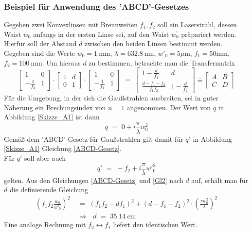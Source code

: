 \documentclass[11pt,a4paper,oneside]{scrartcl}
\begin{document}
\subsubsection{Beispiel für Anwendung des 'ABCD'-Gesetzes}
Gegeben zwei Konvexlinsen mit Brennweiten $f_1,f_2$ soll ein Laserstrahl, dessen Waist $w_0$ anfangs in der ersten Linse sei, auf den Waist $w_0^\prime$ präpariert werden. Hierfür soll der Abstand $d$ zwischen den beiden Linsen bestimmt werden.\\
Gegeben sind die Werte $w_0 = 1\ \mathrm{mm}$, $\lambda = 632.8\ \mathrm{nm}$, ${w'}_0 = 5 \mu \mathrm m$, $f_1 = 50\mathrm{mm}$, $f_2 = 100\ \mathrm{mm}$. Um hieraus $d$ zu bestimmen, betrachte man die Transfermatrix
\begin{equation}
\begin{bmatrix}
    1 & 0 \\
    -\frac{1}{f_2} & 1 
\end{bmatrix}
\cdot
 \begin{bmatrix}
    1 & d \\
    0 & 1 
\end{bmatrix}
\cdot
 \begin{bmatrix}
    1 & 0 \\
    -\frac{1}{f_1} & 1 
\end{bmatrix}
\,\,=\,\,
 \begin{bmatrix}
   1-\frac{d}{f_1} & d \\
    \frac{d-f_1-f_2}{f_1 f_2} & 1-\frac{d}{f_2} 
\end{bmatrix}
\equiv
 \begin{bmatrix}
   A & B \\
    C & D 
\end{bmatrix}
\end{equation}
Für die Umgebung, in der sich die Gaußstrahlen ausbreiten, sei in guter Näherung ein Brechungsindex von $n=1$ angenommen. Der Wert von $q$ in Abbildung \ref{Skizze_A1} ist dann
\begin{equation}
q \,\,=\,\, 0 + i \frac{\pi}{\lambda} w_{0}^2
\end{equation}
Gemäß dem 'ABCD'-Gesetz für Gaußstrahlen gilt damit für $q'$ in Abbildung \ref{Skizze_A1} Gleichung \ref{ABCD-Gesetz}.\\
Für $q'$ soll aber auch
\begin{equation}\label{Gl2}
q' \,\,=\,\, -f_2 + i \frac{\pi}{\lambda} {w'}_{0}^{2}
\end{equation}
gelten. Aus den Gleichungen \ref{ABCD-Gesetz} und \ref{Gl2} nach $d$ auf, erhält man für $d$ die definierende Gleichung
\begin{align}
\left( f_1 f_2 \frac{w_0}{{w'}_{0}} \right)^2 \,\,&=\,\, \left( f_1 f_2 - d f_1 \right)^2 + \left( d - f_1 - f_2 \right)^2 \cdot \left(\frac{\pi w_{0}^{2}}{\lambda} \right)^2\\ \quad&
\Rightarrow \,\,\,\, d \,\,=\,\, 35.14\ \mathrm{cm}
\end{align}
Eine analoge Rechnung mit $f_2\leftrightarrow f_1$ liefert den identischen Wert.
\end{document}
